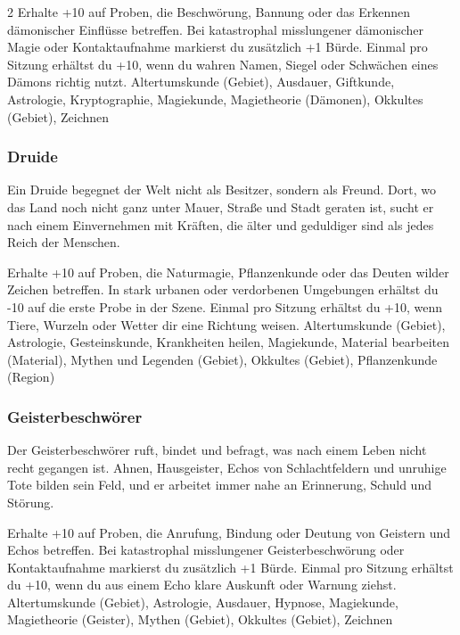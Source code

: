 {\begin{multicols*}{2}
        \wegespielwertebox
        {Erhalte +10 auf Proben, die Beschwörung, Bannung oder das Erkennen dämonischer Einflüsse betreffen.}
        {Bei katastrophal misslungener dämonischer Magie oder Kontaktaufnahme markierst du zusätzlich +1 Bürde.}
        {Einmal pro Sitzung erhältst du +10, wenn du wahren Namen, Siegel oder Schwächen eines Dämons richtig nutzt.}
        {Altertumskunde (Gebiet), Ausdauer, Giftkunde, Astrologie, Kryptographie, Magiekunde, Magietheorie (Dämonen), Okkultes (Gebiet), Zeichnen}

        \subsubsection*{Druide}
        Ein Druide begegnet der Welt nicht als Besitzer, sondern als Freund. Dort, wo das Land noch nicht ganz unter Mauer, Straße und Stadt geraten ist, sucht er nach einem Einvernehmen mit Kräften, die älter und geduldiger sind als jedes Reich der Menschen.

        \wegespielwertebox
        {Erhalte +10 auf Proben, die Naturmagie, Pflanzenkunde oder das Deuten wilder Zeichen betreffen.}
        {In stark urbanen oder verdorbenen Umgebungen erhältst du -10 auf die erste Probe in der Szene.}
        {Einmal pro Sitzung erhältst du +10, wenn Tiere, Wurzeln oder Wetter dir eine Richtung weisen.}
        {Altertumskunde (Gebiet), Astrologie, Gesteinskunde, Krankheiten heilen, Magiekunde, Material bearbeiten (Material), Mythen und Legenden (Gebiet), Okkultes (Gebiet), Pflanzenkunde (Region)}

        \subsubsection*{Geisterbeschwörer}
        Der Geisterbeschwörer ruft, bindet und befragt, was nach einem Leben nicht recht gegangen ist. Ahnen, Hausgeister, Echos von Schlachtfeldern und unruhige Tote bilden sein Feld, und er arbeitet immer nahe an Erinnerung, Schuld und Störung.

        \wegespielwertebox
        {Erhalte +10 auf Proben, die Anrufung, Bindung oder Deutung von Geistern und Echos betreffen.}
        {Bei katastrophal misslungener Geisterbeschwörung oder Kontaktaufnahme markierst du zusätzlich +1 Bürde.}
        {Einmal pro Sitzung erhältst du +10, wenn du aus einem Echo klare Auskunft oder Warnung ziehst.}
        {Altertumskunde (Gebiet), Astrologie, Ausdauer, Hypnose, Magiekunde, Magietheorie (Geister), Mythen (Gebiet), Okkultes (Gebiet), Zeichnen}


\end{multicols*}}

